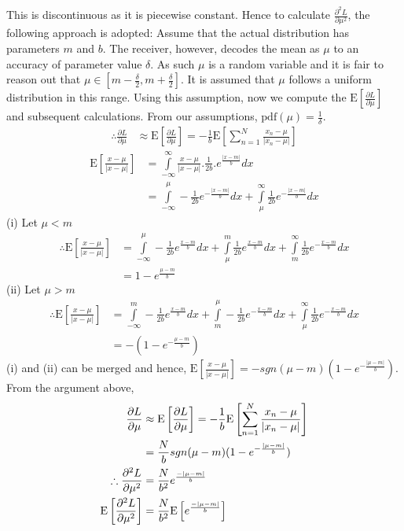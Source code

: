 \documentclass[wcp]{jmlr}
\begin{document}
This is discontinuous as it is piecewise constant. Hence to calculate $\frac{\partial^2 L}{\partial \mu^2}$, the following approach is adopted: 
Assume that the actual distribution has parameters $m$ and 
$b$. The receiver, however, decodes the mean as $\mu$ to an accuracy of parameter
value $\delta$. As such $\mu$ is a random variable and it is fair to reason out
that $\mu \in \left[m-\frac{\delta}{2},m+\frac{\delta}{2}\right]$. It is 
assumed that $\mu$ follows a uniform distribution in this range. Using this 
assumption, now we compute the $\mathrm{E}\left[\frac{\partial L}{\partial \mu}\right]$ 
and subsequent calculations. From our assumptions, $\mathrm{pdf}(\mu) = \frac{1}{\delta}$.
\begin{align*}
 \therefore \frac{\partial L}{\partial \mu} &\approx \mathrm{E}\left[\frac{\partial L}{\partial \mu}\right] = -\frac{1}{b}\mathrm{E}\left[\sum_{n=1}^{N}\frac{x_n-\mu}{|x_n-\mu|}\right]
\end{align*}
\begin{align*}
 \mathrm{E}\left[\frac{x-\mu}{|x-\mu|}\right] &= \int\limits_{-\infty}^{\infty} \frac{x-\mu}{|x-\mu|}.\frac{1}{2b}.e^{\frac{|x-m|}{b}} dx \\
 &= \int\limits_{-\infty}^{\mu} -\frac{1}{2b} e^{-\frac{|x-m|}{b}} dx + \int\limits_{\mu}^{\infty} \frac{1}{2b} e^{-\frac{|x-m|}{b}} dx
\end{align*}
(i) Let $\mu < m$
\begin{align*}
 \therefore \mathrm{E}\left[\frac{x-\mu}{|x-\mu|}\right] &= \int\limits_{-\infty}^{\mu} -\frac{1}{2b} e^{\frac{x-m}{b}} dx + \int\limits_{\mu}^{m} \frac{1}{2b} e^{\frac{x-m}{b}} dx + \int\limits_{m}^{\infty} \frac{1}{2b} e^{-\frac{x-m}{b}} dx \\
 &= 1 - e^{\frac{\mu-m}{b}}
\end{align*}
(ii) Let $\mu > m$
\begin{align*}
 \therefore \mathrm{E}\left[\frac{x-\mu}{|x-\mu|}\right] &= \int\limits_{-\infty}^{m} -\frac{1}{2b} e^{\frac{x-m}{b}} dx + \int\limits_{m}^{\mu} -\frac{1}{2b} e^{-\frac{x-m}{b}} dx + \int\limits_{\mu}^{\infty} \frac{1}{2b} e^{-\frac{x-m}{b}} dx \\
 &= -(1 - e^{-\frac{\mu-m}{b}})
\end{align*}
(i) and (ii) can be merged and hence, $\mathrm{E}\left[\frac{x-\mu}{|x-\mu|}\right] = - sgn(\mu-m) (1 - e^{-\frac{|\mu-m|}{b}})$. From the argument above,
\begin{align}
 \frac{\partial L}{\partial \mu} &\approx \mathrm{E}\left[\frac{\partial L}{\partial \mu}\right] = -\frac{1}{b} \mathrm{E}\left[\sum_{n=1}^{N}\frac{x_n-\mu}{|x_n-\mu|}\right]\notag\\
 &= \frac{N}{b} sgn(\mu-m) (1 - e^{-\frac{|\mu-m|}{b}}) \label{eqn:laplace_expected_approx}\\
 \therefore \frac{\partial^2 L}{\partial \mu^2} &= \frac{N}{b^2} e^{\frac{-|\mu-m|}{b}} \notag\\
 \mathrm{E} \left[\frac{\partial^2 L}{\partial \mu^2}\right] &= \frac{N}{b^2} \mathrm{E}\left[e^{\frac{-|\mu-m|}{b}}\right] \notag
\end{align}
\end{document}
